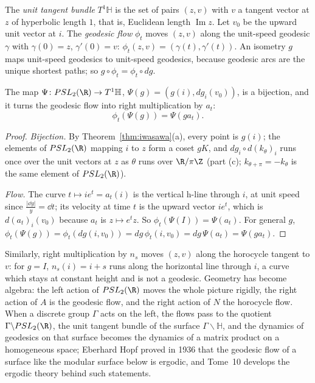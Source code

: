 The \emph{unit tangent bundle} $T^1\mathbb H$ is the set of pairs $(z,v)$ with $v$ a tangent vector at $z$ of hyperbolic length $1$, that is, Euclidean length $\operatorname{Im}z$. Let $v_0$ be the upward
unit vector at $i$. The \emph{geodesic flow} $\phi_t$ moves $(z,v)$ along the unit-speed geodesic $\gamma$ with $\gamma(0)=z$, $\gamma'(0)=v$: $\phi_t(z,v)=(\gamma(t),\gamma'(t))$. An isometry $g$ maps
unit-speed geodesics to unit-speed geodesics, because geodesic arcs are the unique shortest paths; so $g\circ\phi_t=\phi_t\circ dg$.

\begin{theorem}\label{thm:geodflow}
The map $\Psi\colon PSL_2(\R)\to T^1\mathbb H$, $\Psi(g)=(g(i),dg_i(v_0))$, is a bijection, and it turns the geodesic flow into right multiplication by $a_t$:
\[\phi_t(\Psi(g))=\Psi(ga_t).\]
\end{theorem}

\begin{proof}
\emph{Bijection.} By Theorem~\ref{thm:iwasawa}(a), every point is $g(i)$; the elements of $PSL_2(\R)$ mapping $i$ to $z$ form a coset $gK$, and $dg_i\circ d(k_\theta)_i$ runs once over the unit vectors at $z$
as $\theta$ runs over $\R/\pi\Z$ (part (c); $k_{\theta+\pi}=-k_\theta$ is the same element of $PSL_2(\R)$).

\emph{Flow.} The curve $t\mapsto ie^t=a_t(i)$ is the vertical h-line through $i$, at unit speed since $\frac{|\dd y|}y=\dd t$; its velocity at time $t$ is the upward vector $ie^t$, which is $d(a_t)_i(v_0)$ because
$a_t$ is $z\mapsto e^tz$. So $\phi_t(\Psi(I))=\Psi(a_t)$. For general $g$, $\phi_t(\Psi(g))=\phi_t(dg(i,v_0))=dg\,\phi_t(i,v_0)=dg\,\Psi(a_t)=\Psi(ga_t)$.
\end{proof}

Similarly, right multiplication by $n_s$ moves $(z,v)$ along the horocycle tangent to $v$: for $g=I$, $n_s(i)=i+s$ runs along the horizontal line through $i$, a curve which stays at
constant height and is not a geodesic. Geometry has become algebra: the left action of $PSL_2(\R)$ moves the whole picture rigidly, the right action of $A$ is the geodesic flow, and
the right action of $N$ the horocycle flow. When a discrete group $\Gamma$ acts on the left, the flows pass to the quotient $\Gamma\backslash PSL_2(\R)$, the unit tangent bundle of the surface
$\Gamma\backslash\mathbb H$, and the dynamics of geodesics on that surface becomes the dynamics of a matrix product on a homogeneous space; Eberhard Hopf proved in 1936 that the
geodesic flow of a surface like the modular surface below is ergodic, and Tome~10 develops the ergodic theory behind such statements.

